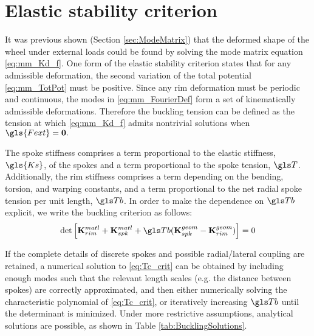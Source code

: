 \documentclass[\rootdir/thesis.tex]{subfiles}
\begin{document}
\section{Elastic stability criterion}
It was previous shown (Section \ref{sec:ModeMatrix}) that the deformed shape of the wheel under external loads could be found by solving the mode matrix equation \eqref{eq:mm_Kd_f}. One form of the elastic stability criterion states that for any admissible deformation, the second variation of the total potential \eqref{eq:mm_TotPot} must be positive. Since any rim deformation must be periodic and continuous, the modes in \eqref{eq:mm_FourierDef} form a set of kinematically admissible deformations. Therefore the buckling tension can be defined as the tension at which \eqref{eq:mm_Kd_f} admits nontrivial solutions when $\gls{Fext}=\mathbf{0}.$

The spoke stiffness comprises a term proportional to the elastic stiffness, $\gls{Ks}$, of the spokes and a term proportional to the spoke tension, $\T$. Additionally, the rim stiffness comprises a term depending on the bending, torsion, and warping constants, and a term proportional to the net radial spoke tension per unit length, $\Tb$. In order to make the dependence on $\Tb$ explicit, we write the buckling criterion as follows:
\begin{equation}
\label{eq:Tc_crit}
\det{\left[\matl{\KmRim} + \matl{\KmSpk} + \Tb(\geom{\KmSpk} - \geom{\KmRim})\right]} = 0
\end{equation}

If the complete details of discrete spokes and possible radial/lateral coupling are retained, a numerical solution to \eqref{eq:Tc_crit} can be obtained by including enough modes such that the relevant length scales (e.g. the distance between spokes) are correctly approximated, and then either numerically solving the characteristic polynomial of \eqref{eq:Tc_crit}, or iteratively increasing $\Tb$ until the determinant is minimized. Under more restrictive assumptions, analytical solutions are possible, as shown in Table \ref{tab:BucklingSolutions}.
\end{document}
